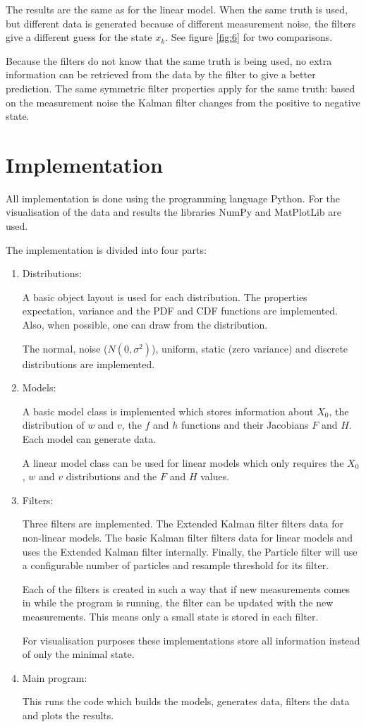 \documentclass[paper=a4, fontsize=11pt]{scrartcl} %
\numberwithin{equation}{section} %
\numberwithin{figure}{section} %
\numberwithin{table}{section} %
\begin{document}
The results are the same as for the linear model.
When the same truth is used, but different data is generated because of different measurement noise, the filters give a different guess for the state $x_k$. See figure \ref{fig:6} for two comparisons.

Because the filters do not know that the same truth is being used, no extra information can be retrieved from the data by the filter to give a better prediction. The same symmetric filter properties apply for the same truth: based on the measurement noise the Kalman filter changes from the positive to negative state. 

\section{Implementation}

All implementation is done using the programming language Python. For the visualisation of the data and results the libraries NumPy and MatPlotLib are used.

The implementation is divided into four parts:
\begin{enumerate}
	\item Distributions:
	
	A basic object layout is used for each distribution. The properties expectation, variance and the PDF and CDF functions are implemented. Also, when possible, one can draw from the distribution.
	
	The normal, noise ($N(0, \sigma^2)$), uniform, static (zero variance) and discrete distributions are implemented.
	
	\item Models:
	
	A basic model class is implemented which stores information about $X_0$, the distribution of $w$ and $v$, the $f$ and $h$ functions and their Jacobians $F$ and $H$. Each model can generate data.
	
	A linear model class can be used for linear models which only requires the $X_0$, $w$ and $v$ distributions and the $F$ and $H$ values.
	
	\item Filters:
	
	Three filters are implemented. The Extended Kalman filter filters data for non-linear models. The basic Kalman filter filters data for linear models and uses the Extended Kalman filter internally. Finally, the Particle filter will use a configurable number of particles and resample threshold for its filter.
	
	Each of the filters is created in such a way that if new measurements comes in while the program is running, the filter can be updated with the new measurements. This means only a small state is stored in each filter.
	
	For visualisation purposes these implementations store all information instead of only the minimal state. 
	
	\item Main program:
	
	This runs the code which builds the models, generates data, filters the data and plots the results.
	
	
\end{enumerate}
\end{document}
